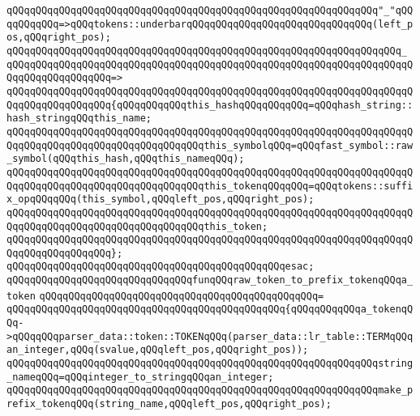 \verb|qQQqqQQqqQQqqQQqqQQqqQQqqQQqqQQqqQQqqQQqqQQqqQQqqQQqqQQqqQQqqQQq"_"qQQqqQQqqQQq=>qQQqtokens::underbarqQQqqQQqqQQqqQQqqQQqqQQqqQQqqQQq(left_pos,qQQqright_pos);|\newline
\verb|qQQqqQQqqQQqqQQqqQQqqQQqqQQqqQQqqQQqqQQqqQQqqQQqqQQqqQQqqQQqqQQqqQQq_|\newline
\verb|qQQqqQQqqQQqqQQqqQQqqQQqqQQqqQQqqQQqqQQqqQQqqQQqqQQqqQQqqQQqqQQqqQQqqQQqqQQqqQQqqQQqqQQq=>|\newline
\verb|qQQqqQQqqQQqqQQqqQQqqQQqqQQqqQQqqQQqqQQqqQQqqQQqqQQqqQQqqQQqqQQqqQQqqQQqqQQqqQQqqQQqqQQq{qQQqqQQqqQQqthis_hashqQQqqQQqqQQq=qQQqhash_string::hash_stringqQQqthis_name;|\newline
\verb|qQQqqQQqqQQqqQQqqQQqqQQqqQQqqQQqqQQqqQQqqQQqqQQqqQQqqQQqqQQqqQQqqQQqqQQqqQQqqQQqqQQqqQQqqQQqqQQqqQQqqQQqthis_symbolqQQq=qQQqfast_symbol::raw_symbol(qQQqthis_hash,qQQqthis_nameqQQq);|\newline
\verb|qQQqqQQqqQQqqQQqqQQqqQQqqQQqqQQqqQQqqQQqqQQqqQQqqQQqqQQqqQQqqQQqqQQqqQQqqQQqqQQqqQQqqQQqqQQqqQQqqQQqqQQqthis_tokenqQQqqQQq=qQQqtokens::suffix_opqQQqqQQq(this_symbol,qQQqleft_pos,qQQqright_pos);|\newline
\newline
\verb|qQQqqQQqqQQqqQQqqQQqqQQqqQQqqQQqqQQqqQQqqQQqqQQqqQQqqQQqqQQqqQQqqQQqqQQqqQQqqQQqqQQqqQQqqQQqqQQqqQQqqQQqthis_token;|\newline
\verb|qQQqqQQqqQQqqQQqqQQqqQQqqQQqqQQqqQQqqQQqqQQqqQQqqQQqqQQqqQQqqQQqqQQqqQQqqQQqqQQqqQQqqQQq};|\newline
\verb|qQQqqQQqqQQqqQQqqQQqqQQqqQQqqQQqqQQqqQQqqQQqqQQqesac;|\newline
\newline
\verb|qQQqqQQqqQQqqQQqqQQqqQQqqQQqqQQqfunqQQqraw_token_to_prefix_tokenqQQqa_token|\newline
\verb|qQQqqQQqqQQqqQQqqQQqqQQqqQQqqQQqqQQqqQQqqQQqqQQq=|\newline
\verb|qQQqqQQqqQQqqQQqqQQqqQQqqQQqqQQqqQQqqQQqqQQqqQQq{qQQqqQQqqQQqa_tokenqQQq->qQQqqQQqparser_data::token::TOKENqQQq(parser_data::lr_table::TERMqQQqan_integer,qQQq(svalue,qQQqleft_pos,qQQqright_pos));|\newline
\newline
\verb|qQQqqQQqqQQqqQQqqQQqqQQqqQQqqQQqqQQqqQQqqQQqqQQqqQQqqQQqqQQqqQQqstring_nameqQQq=qQQqinteger_to_stringqQQqan_integer;|\newline
\newline
\verb|qQQqqQQqqQQqqQQqqQQqqQQqqQQqqQQqqQQqqQQqqQQqqQQqqQQqqQQqqQQqqQQqmake_prefix_tokenqQQq(string_name,qQQqleft_pos,qQQqright_pos);|\newline
